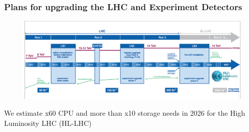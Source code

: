 \begin{frame}
\frametitle{Plans for upgrading the LHC and Experiment Detectors}

\begin{figure}[htbp]
\begin{center}
\includegraphics[width=1.0\textwidth]{images/lhc-upgrade-timeline-detail.png}
\end{center}
\end{figure}

\small{We estimate x60 CPU and more than x10 storage needs in 2026 for the High Luminosity LHC (HL-LHC)}

\end{frame}


